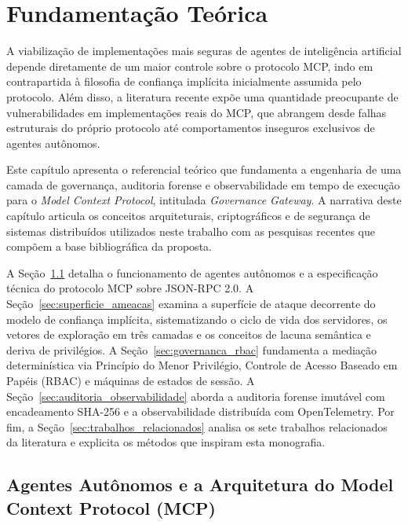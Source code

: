 \chapter{Fundamentação Teórica}
\label{cap:fundamentacao}

A viabilização de implementações mais seguras de agentes de inteligência artificial depende diretamente de um maior controle sobre o protocolo MCP, indo em contrapartida à filosofia de confiança implícita inicialmente assumida pelo protocolo. Além disso, a literatura recente expõe uma quantidade preocupante de vulnerabilidades em implementações reais do MCP, que abrangem desde falhas estruturais do próprio protocolo até comportamentos inseguros exclusivos de agentes autônomos.

Este capítulo apresenta o referencial teórico que fundamenta a engenharia de uma camada de governança, auditoria forense e observabilidade em tempo de execução para o \textit{Model Context Protocol}, intitulada \textit{Governance Gateway}. A narrativa deste capítulo articula os conceitos arquiteturais, criptográficos e de segurança de sistemas distribuídos utilizados neste trabalho com as pesquisas recentes que compõem a base bibliográfica da proposta.

A Seção~\ref{sec:arquitetura_mcp} detalha o funcionamento de agentes autônomos e a especificação técnica do protocolo MCP sobre JSON-RPC 2.0. A Seção~\ref{sec:superficie_ameacas} examina a superfície de ataque decorrente do modelo de confiança implícita, sistematizando o ciclo de vida dos servidores, os vetores de exploração em três camadas e os conceitos de lacuna semântica e deriva de privilégios. A Seção~\ref{sec:governanca_rbac} fundamenta a mediação determinística via Princípio do Menor Privilégio, Controle de Acesso Baseado em Papéis (RBAC) e máquinas de estados de sessão. A Seção~\ref{sec:auditoria_observabilidade} aborda a auditoria forense imutável com encadeamento SHA-256 e a observabilidade distribuída com OpenTelemetry. Por fim, a Seção~\ref{sec:trabalhos_relacionados} analisa os sete trabalhos relacionados da literatura e explicita os métodos que inspiram esta monografia.

\section{Agentes Autônomos e a Arquitetura do Model Context Protocol (MCP)}
\label{sec:arquitetura_mcp}

